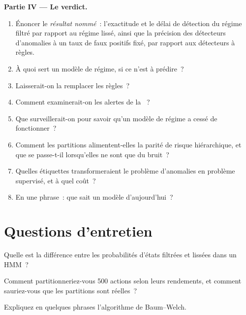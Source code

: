 \begin{problem}
\medskip\noindent\textbf{Partie IV --- Le verdict.}
\begin{enumerate}[resume]
\item Énoncer le \emph{résultat nommé}~: l'exactitude et le délai de détection du régime filtré par rapport au régime lissé, ainsi que la précision des détecteurs
d'anomalies à un taux de faux positifs fixé, par rapport aux détecteurs à règles.
\item À quoi sert un modèle de régime, si ce n'est à prédire~?
\item Laisserait-on la  remplacer les règles~?
\item Comment examinerait-on les alertes de la ~?
\item Que surveillerait-on pour savoir qu'un modèle de régime a cessé de fonctionner~?
\item Comment les partitions alimentent-elles la parité de risque hiérarchique, et que se passe-t-il lorsqu'elles ne sont que du bruit~?
\item Quelles étiquettes transformeraient le problème d'anomalies en problème supervisé, et à quel coût~?
\item En une phrase~: que sait un modèle d'aujourd'hui~?
\end{enumerate}
\end{problem}

\section{Questions d'entretien}

\begin{interviewq}\label{iq:ml:clustering-regimes-and-anomaly-detection:1}
Quelle est la différence entre les probabilités d'états filtrées et lissées dans un HMM~?
\end{interviewq}

\begin{interviewq}\label{iq:ml:clustering-regimes-and-anomaly-detection:2}
Comment partitionneriez-vous 500 actions selon leurs rendements, et comment sauriez-vous que les partitions sont réelles~?
\end{interviewq}

\begin{interviewq}\label{iq:ml:clustering-regimes-and-anomaly-detection:3}
Expliquez en quelques phrases l'algorithme de Baum--Welch.
\end{interviewq}


